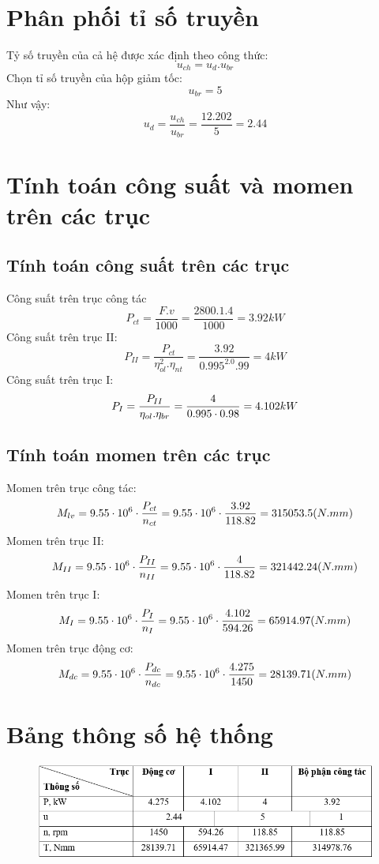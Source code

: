 \section{Phân phối tỉ số truyền}
Tỷ số truyền của cả hệ được xác định theo công thức:
\[
    u_{ch} = u_d.u_{br} 
\]
Chọn tỉ số truyền của hộp giảm tốc:
\[
    u_{br} = 5
\]
Như vậy: 
\[
    u_d = \frac{u_{ch}}{u_{br}} = \frac{12.202}{5} = 2.44
\]

\section{Tính toán công suất và momen trên các trục}
\subsection{Tính toán công suất trên các trục}
Công suất trên trục công tác
\[
    P_{ct} = \frac{F.v}{1000} = \frac{2800.1.4}{1000} = 3.92 kW
\]
Công suất trên trục II:
\[
    P_{II} = \frac{P_{ct}}{\eta_{ol}^2.\eta_{nt}} = \frac{3.92}{0.995^2.0.99} = 4 kW
\]
Công suất trên trục I:
\[
    P_{I} = \frac{P_{II}}{\eta_{ol}.\eta_{br}} = \frac{4}{0.995 \cdot 0.98} = 4.102 kW \\
\]
\subsection{Tính toán momen trên các trục}
Momen trên trục công tác:
\[
    M_{lv} = 9.55 \cdot 10^6 \cdot \frac{P_{ct}}{n_{ct}} = 9.55 \cdot 10^6 \cdot \frac{3.92}{118.82} = 315053.5 (N.mm) \\
\]
Momen trên trục II:
\[
    M_{II} = 9.55 \cdot 10^6 \cdot \frac{P_{II}}{n_{II}} = 9.55 \cdot 10^6 \cdot \frac{4}{118.82} = 321442.24 (N.mm) \\
\]
Momen trên trục I:
\[
    M_{I} = 9.55 \cdot 10^6 \cdot \frac{P_{I}}{n_{I}} = 9.55 \cdot 10^6 \cdot \frac{4.102}{594.26} = 65914.97 (N.mm) \\
\]
Momen trên trục động cơ:
\[
    M_{dc} = 9.55 \cdot 10^6 \cdot \frac{P_{dc}}{n_{dc}} = 9.55 \cdot 10^6 \cdot \frac{4.275}{1450} = 28139.71 (N.mm) \\
\]

\section{Bảng thông số hệ thống}
\begin{figure}[H]
    \centering
    \includegraphics[width=1\textwidth]{pictures/bangdactinh.png}
\end{figure}
